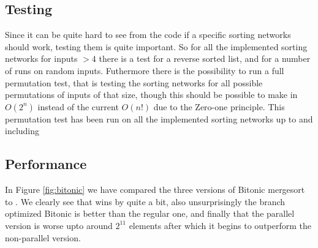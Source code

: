 \subsection{Testing}
Since it can be quite hard to see from the code if a specific sorting networks
should work, testing them is quite important. So for all the implemented
sorting networks for inputs $>4$ there is a test for a reverse sorted list, and
for a number of runs on random inputs. Futhermore there is the possibility to
run a full permutation test, that is testing the sorting networks for all
possible permutations of inputs of that size, though this should be possible to
make in $O(2^n)$ instead of the current $O(n!)$ due to the Zero-one principle.
This permutation test has been run on all the implemented sorting networks up
to and including 

\subsection{Performance}
In Figure \ref{fig:bitonic} we have compared the three versions of Bitonic
mergesort to . We clearly see that  wins by
quite a bit, also unsurprisingly the branch optimized Bitonic is better than
the regular one, and finally that the parallel version is worse upto around
$2^{11}$ elements after which it begins to outperform the non-parallel version.
